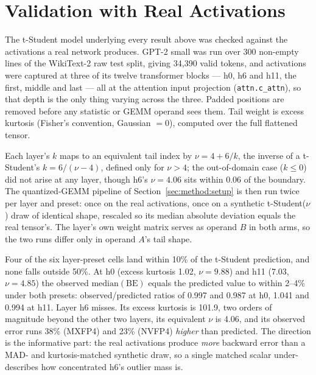 \section{Validation with Real Activations}
\label{sec:validation}

The t-Student model underlying every result above was checked against the
activations a real network produces. GPT-2 small \citep{radford2019language} was
run over 300 non-empty lines of the WikiText-2 \citep{merity2016pointer} raw test
split, giving 34,390 valid tokens, and activations were captured at three of its
twelve transformer blocks --- h0, h6 and h11, the first, middle and last --- all
at the attention input projection (\texttt{attn.c\_attn}), so that depth is the
only thing varying across the three. Padded positions are removed before any
statistic or GEMM operand sees them. Tail weight is excess kurtosis (Fisher's
convention, Gaussian $= 0$), computed over the full flattened tensor.

Each layer's $k$ maps to an equivalent tail index by $\nu = 4 + 6/k$, the inverse
of a t-Student's $k = 6/(\nu - 4)$, defined only for $\nu > 4$; the out-of-domain
case ($k \le 0$) did not arise at any layer, though h6's $\nu = 4.06$ sits within
0.06 of the boundary. The quantized-GEMM pipeline of
Section~\ref{sec:method:setup} is then run twice per layer and preset: once on
the real activations, once on a synthetic t-Student($\nu$) draw of identical
shape, rescaled so its median absolute deviation equals the real tensor's. The
layer's own weight matrix serves as operand $B$ in both arms, so the two runs
differ only in operand $A$'s tail shape.

Four of the six layer-preset cells land within 10\% of the t-Student prediction,
and none falls outside 50\%. At h0 (excess kurtosis 1.02, $\nu = 9.88$) and h11
(7.03, $\nu = 4.85$) the observed $\mathrm{median}(\mathrm{BE})$ equals the
predicted value to within 2--4\% under both presets: observed/predicted ratios of
0.997 and 0.987 at h0, 1.041 and 0.994 at h11. Layer h6 misses. Its excess
kurtosis is 101.9, two orders of magnitude beyond the other two layers, its
equivalent $\nu$ is 4.06, and its observed error runs 38\% (MXFP4) and 23\%
(NVFP4) \emph{higher} than predicted. The direction is the informative part: the
real activations produce \emph{more} backward error than a MAD- and
kurtosis-matched synthetic draw, so a single matched scalar under-describes how
concentrated h6's outlier mass is.

